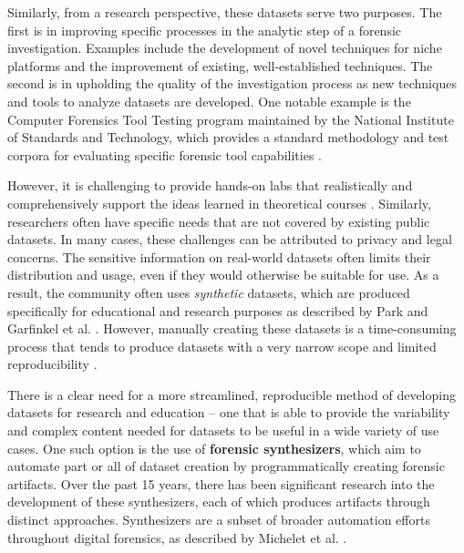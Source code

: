 \documentclass[final,5p,times,twocolumn]{elsarticle}
\begin{document}
Similarly, from a research perspective, these datasets serve two
purposes. The first is in improving specific processes in the analytic
step of a forensic investigation. Examples include the development of
novel techniques for niche platforms and the improvement of existing,
well-established techniques. The second is in upholding the quality of
the investigation process as new techniques and tools to analyze
datasets are developed. One notable example is the Computer Forensics
Tool Testing program maintained by the National Institute of Standards
and Technology, which provides a standard methodology and test corpora
for evaluating specific forensic tool capabilities
\cite{nationalinstituteofstandardsandtechnologyComputerForensicsTool2017}.

However, it is challenging to provide hands-on labs that realistically
and comprehensively support the ideas learned in theoretical courses
\cite{adelsteinAutomaticallyCreatingRealistic2005,guptaDigitalForensicsLab2022,lawrenceFrameworkDesignWebbased2009}.
Similarly, researchers often have specific needs that are not covered by
existing public datasets. In many cases, these challenges can be
attributed to privacy and legal concerns. The sensitive information on
real-world datasets often limits their distribution and usage, even if
they would otherwise be suitable for use. As a result, the community
often uses \emph{synthetic} datasets, which are produced specifically
for educational and research purposes as described by Park and Garfinkel
et al.
\cite{parkTREDEVMPOPCultivating2018,garfinkelBringingScienceDigital2009}.
However, manually creating these datasets is a time-consuming process
that tends to produce datasets with a very narrow scope and limited
reproducibility
\cite{garfinkelBringingScienceDigital2009,grajedaAvailabilityDatasetsDigital2017}.

There is a clear need for a more streamlined, reproducible method of
developing datasets for research and education -- one that is able to
provide the variability and complex content needed for datasets to be
useful in a wide variety of use cases. One such option is the use of
\textbf{forensic synthesizers}, which aim to automate part or all of
dataset creation by programmatically creating forensic artifacts. Over
the past 15 years, there has been significant research into the
development of these synthesizers, each of which produces artifacts
through distinct approaches. Synthesizers are a subset of broader
automation efforts throughout digital forensics, as described by
Michelet et al. \cite{micheletAutomationDigitalForensics2023}.
\end{document}

